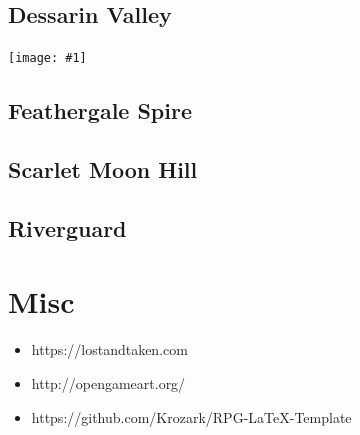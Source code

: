 \documentclass[12pt,oneside]{book}
\newcommand{\showmap}[1]{
	\begin{center}
		\texttt{[image: \#1]}
	\end{center}
}
\begin{document}
\newpage

\section{Dessarin Valley}

	\showmap{images/maps/dessarin-valley}

\newpage

\section{Feathergale Spire}

\section{Scarlet Moon Hill}

\section{Riverguard}

\newpage

\chapter{Misc}
\begin{itemize}
	\item https://lostandtaken.com
	\item http://opengameart.org/
	\item https://github.com/Krozark/RPG-LaTeX-Template
\end{itemize}
\end{document}
